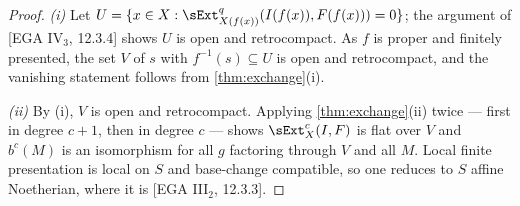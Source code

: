 \begin{theorem}
  \begin{proof}
    \emph{(i)} Let $U = \{ x \in X : \sExt^q_{X(f(x))}(I(f(x)),F(f(x))) = 0 \}$;
    the argument of [EGA IV$_3$, 12.3.4] shows $U$ is open and retrocompact. As
    $f$ is proper and finitely presented, the set $V$ of $s$ with $f^{-1}(s)
    \subseteq U$ is open and retrocompact, and the vanishing statement follows
    from \cref{thm:exchange}(i).

    \emph{(ii)} By (i), $V$ is open and retrocompact. Applying
    \cref{thm:exchange}(ii) twice — first in degree $c+1$, then in degree $c$ —
    shows $\sExt^c_X(I,F)$ is flat over $V$ and $b^c(M)$ is an isomorphism for all
    $g$ factoring through $V$ and all $M$. Local finite presentation is local on
    $S$ and base-change compatible, so one reduces to $S$ affine Noetherian, where
    it is [EGA III$_2$, 12.3.3].
  \end{proof}
\end{theorem}
